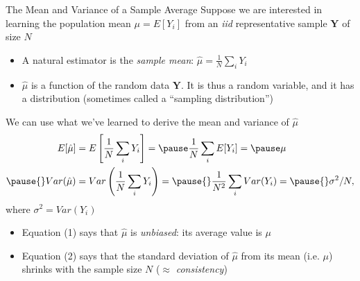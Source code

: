 \documentclass[11pt,english,handout]{beamer}
\begin{document}
\begin{frame}{The Mean and Variance of a Sample Average}
\vspace{0.2cm}
Suppose we are interested in learning the population mean $\mu=E[Y_i]$ from an \emph{iid} representative sample $\mathbf{Y}$ of size $N$\pause{} 
\pause{}
\begin{itemize}
\item A natural estimator is the \emph{sample mean}: $\hat{\mu}=\frac{1}{N}\sum_i Y_{i}$
\vspace{0.1cm}\pause{}
\item $\hat{\mu}$ is a function of the random data $\mathbf{Y}$. It is thus a random variable, and it has a distribution (sometimes called a ``sampling distribution'')
\end{itemize}
\vspace{0.4cm}
\pause{}

We can use what we've learned to derive the mean and variance of $\hat{\mu}$
\begin{align*}
E[\hat{\mu}]&=E\left[\frac{1}{N}\sum_i Y_i\right]=\pause\frac{1}{N}\sum_i E[Y_i]=\pause\mu\\\pause{}
Var(\hat{\mu})&=Var\left(\frac{1}{N}\sum_i Y_i\right)=\pause{}\frac{1}{N^2}\sum_iVar(Y_i)=\pause{}\sigma^2/N,
\end{align*}
where $\sigma^2=Var(Y_i)$ 
\pause{}

\begin{itemize}
\item Equation (1) says that $\hat{\mu}$ is \emph{unbiased}: its average value is $\mu$
\vspace{0.1cm}
\pause{}
\item Equation (2) says that the standard deviation of $\hat{\mu}$ from its mean (i.e. $\mu$) shrinks with the sample size $N$ ($\approx$ \emph{consistency})
\end{itemize}

\end{frame}
\end{document}
